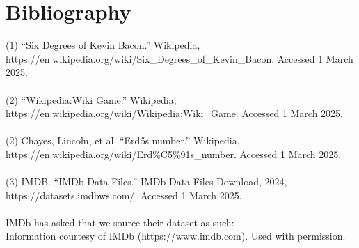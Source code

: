 \documentclass{article}
\begin{document}
\section{Bibliography}

(1) “Six Degrees of Kevin Bacon.” Wikipedia, https://en.wikipedia.org/wiki/Six\_Degrees\_of\_Kevin\_Bacon. Accessed 1 March 2025.\\\\

(2) “Wikipedia:Wiki Game.” Wikipedia, https://en.wikipedia.org/wiki/Wikipedia:Wiki\_Game. Accessed 1 March 2025.\\\\

(2) Chayes, Lincoln, et al. “Erdős number.” Wikipedia, https://en.wikipedia.org/wiki/Erd\%C5\%91s\_number. Accessed 1 March 2025.\\\\

(3) IMDB. “IMDb Data Files.” IMDb Data Files Download, 2024, https://datasets.imdbws.com/. Accessed 1 March 2025.\\\\



IMDb has asked that we source their dataset as such:\\
Information courtesy of
IMDb
(https://www.imdb.com).
Used with permission.
\end{document}
